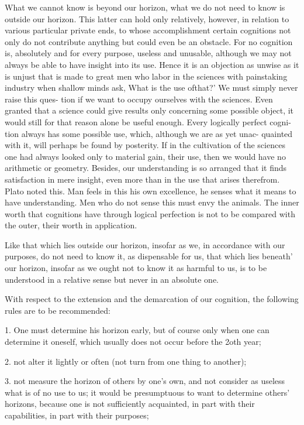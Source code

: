     What we cannot know is beyond our horizon,
    what we do not need to know is outside our horizon.
     This latter can hold only relatively, however,
    in relation to various particular private ends, to whose accomplishment
    certain cognitions not only do not contribute anything but could even be
    an obstacle. For no cognition is, absolutely and for every purpose, useless
    and unusable, although we may not always be able to have insight into its
    use. Hence it is an objection as unwise as it is unjust that is made to great
    men who labor in the sciences with painstaking industry when shallow
    minds ask, What is the use ofthat?' We must simply never raise this ques-
    tion if we want to occupy ourselves with the sciences. Even granted that a
    science could give results only concerning some possible object, it would
    still for that reason alone be useful enough. Every logically perfect cogni-
    tion always has some possible use, which, although we are as yet unac-
    quainted with it, will perhaps be found by posterity. If in the cultivation of
    the sciences one had always looked only to material gain, their use, then
    we would have no arithmetic or geometry. Besides, our understanding is
    so arranged that it finds satisfaction in mere insight, even more than in the
    use that arises therefrom. Plato noted this. Man feels in this his own
    excellence, he senses what it means to have understanding. Men who do
    not sense this must envy the animals. The inner worth that cognitions have
    through logical perfection is not to be compared with the outer, their worth
    in application.

    Like that which lies outside our horizon, insofar as we, in accordance
    with our purposes, do not need to know it, as dispensable for us, that which
    lies beneath' our horizon, insofar as we ought not to know it as harmful to
    us, is to be understood in a relative sense but never in an absolute one.

    With respect to the extension and the demarcation of our cognition,
    the following rules are to be recommended:

    1. One must determine his horizon early,
    but of course only when one can determine it oneself,
    which usually does not occur before the 2oth year;

    2. not alter it lightly or often
    (not turn from one thing to another);

    3. not measure the horizon of others by one's own,
    and not consider as useless what is of no use to us;
    it would be presumptuous to want to determine others' horizons,
    because one is not sufficiently acquainted,
    in part with their capabilities,
    in part with their purposes;

